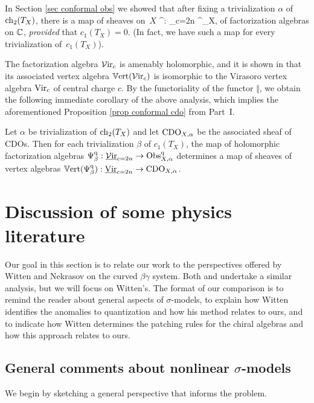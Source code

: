 In Section \ref{sec conformal obs} we showed that after fixing a trivialization $\alpha$ of ${\rm ch}_2(T_X)$, 
there is a map of sheaves on~$X$ 
\ben
\Psi^\q : \ul{\sVir}_{c=2n} \to \Obs^\q_{X, \alpha}
\een 
of factorization algebras on $\mathbb C$, {\em provided} that $c_1(T_X) = 0$. (In fact, we have such a map for every trivialization of~$c_1(T_X)$). 

The factorization algebra $\mathcal{V}{\rm ir}_{c}$ is amenably holomorphic, and it is shown in \cite{bw_vir} that its associated vertex algebra $\mathbb{V}{\rm ert}(\mathcal{V}{\rm ir}_{c})$ is isomorphic to the Virasoro vertex algebra ${\rm Vir}_c$ of central charge $c$. 
By the functoriality of the functor $\Vert$, 
we obtain the following immediate corollary of the above analysis, which implies the aforementioned Proposition \ref{prop conformal cdo} from Part~I. 

\begin{cor} 
Let $\alpha$ be trivialization of ${\rm ch}_2(T_X)$ and let ${\rm CDO}_{X,\alpha}$ be the associated sheaf of CDOs. 
Then for each trivialization $\beta$ of $c_1(T_X)$, 
the map of holomorphic factorization algebras $\Psi^{\rm q}_\beta : \underline{\mathcal{V}{\rm ir}}_{c=2n} \to {\rm Obs}^{\rm q}_{X,\alpha}$ determines a map of sheaves of vertex algebras $\mathbb{V}{\rm ert}(\Psi^{\rm q}_\beta) : \underline{\rm Vir}_{c=2n} \to {\rm CDO}_{X,\alpha}$.
\end{cor}

\section{Discussion of some physics literature}

Our goal in this section is to relate our work to the perspectives offered by Witten and Nekrasov on the curved $\beta\gamma$ system.
Both \cite{WittenCDO} and \cite{Nek} undertake a similar analysis, but we will focus on Witten's.
The format of our comparison is to remind the reader about general aspects of $\sigma$-models,
to explain how Witten identifies the anomalies to quantization and how his method relates to ours,
and to indicate how Witten determines the patching rules for the chiral algebras and how this approach relates to ours.

\subsection{General comments about nonlinear $\sigma$-models}

\def\Maps{{\rm Maps}}

We begin by sketching a general perspective that informs the problem.

